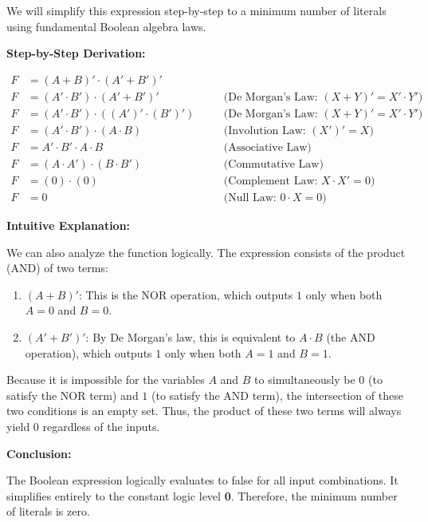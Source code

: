\documentclass[12pt,a3paper]{article}
\begin{document}
\begin{enumerate}
\begin{tcolorbox}[enhanced,breakable,ansbox,colback=cA!4,colframe=cA,boxrule=0.8pt,arc=5pt,title={\textbf{Answer}},fonttitle=\bfseries\color{white},colbacktitle=cA]
We will simplify this expression step-by-step to a minimum number of literals using fundamental Boolean algebra laws.

\vspace{0.5cm}
\textbf{Step-by-Step Derivation:}

\begin{align*}
F &= (A + B)' \cdot (A' + B')' \\
F &= (A' \cdot B') \cdot (A' + B')' \quad &&\text{(De Morgan's Law: } (X+Y)' = X' \cdot Y' \text{)} \\
F &= (A' \cdot B') \cdot ((A')' \cdot (B')') \quad &&\text{(De Morgan's Law: } (X+Y)' = X' \cdot Y' \text{)} \\
F &= (A' \cdot B') \cdot (A \cdot B) \quad &&\text{(Involution Law: } (X')' = X \text{)} \\
F &= A' \cdot B' \cdot A \cdot B \quad &&\text{(Associative Law)} \\
F &= (A \cdot A') \cdot (B \cdot B') \quad &&\text{(Commutative Law)} \\
F &= (0) \cdot (0) \quad &&\text{(Complement Law: } X \cdot X' = 0 \text{)} \\
F &= 0 \quad &&\text{(Null Law: } 0 \cdot X = 0 \text{)}
\end{align*}

\vspace{0.5cm}
\textbf{Intuitive Explanation:}

We can also analyze the function logically. The expression consists of the product (AND) of two terms:
\begin{enumerate}
    \item $(A + B)'$: This is the NOR operation, which outputs $1$ only when both $A = 0$ and $B = 0$.
    \item $(A' + B')'$: By De Morgan's law, this is equivalent to $A \cdot B$ (the AND operation), which outputs $1$ only when both $A = 1$ and $B = 1$.
\end{enumerate}
Because it is impossible for the variables $A$ and $B$ to simultaneously be $0$ (to satisfy the NOR term) and $1$ (to satisfy the AND term), the intersection of these two conditions is an empty set. Thus, the product of these two terms will always yield $0$ regardless of the inputs.

\vspace{0.3cm}
\textbf{Conclusion:}

The Boolean expression logically evaluates to false for all input combinations. It simplifies entirely to the constant logic level \textbf{0}. Therefore, the minimum number of literals is zero.
\end{tcolorbox}


\end{enumerate}
\end{document}
